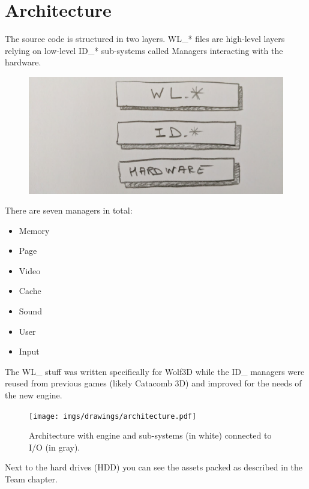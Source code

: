 \documentclass[book.tex]{subfiles}
\begin{document}
\section{Architecture}

The source code is structured in two layers. WL\_* files are high-level layers relying on low-level ID\_* sub-systems called Managers interacting with the hardware.\\
\par
 \par
\begin{figure}[H]
\centering
 \includegraphics[width=\textwidth]{imgs/drawings/layers.png}
 \end{figure}
 \par
\par
There are seven managers in total:\\
\begin{itemize}
	\item Memory
	\item Page
	\item Video
	\item Cache
	\item Sound
	\item User
	\item Input
\end{itemize}
The WL\_ stuff was written specifically for Wolf3D while the ID\_ managers were reused from previous games (likely Catacomb 3D) and improved for the needs of the new engine.

\begin{figure}[H]
\centering
\texttt{[image: imgs/drawings/architecture.pdf]}
\caption{Architecture with engine and sub-systems (in white) connected to I/O (in gray).}
\label{fig:architecture}
\end{figure}
Next to the hard drives (HDD) you can see the assets packed as described in the Team chapter.
\end{document}
